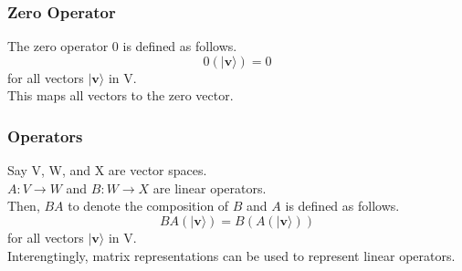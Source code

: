 \documentclass{article}
\begin{document}
\subsubsection{Zero Operator}
The zero operator \textbf{$0$} is defined as follows. \\
\begin{equation}
    0(|\mathbf{v}\rangle) = 0
\end{equation} for all vectors $|\mathbf{v}\rangle$ in V. \\
This maps all vectors to the zero vector. \\
\subsubsection{Operators}
Say V, W, and X are vector spaces. \\
$A: V \rightarrow W$ and $B: W \rightarrow X$ are linear operators. \\
Then, $BA$ to denote the composition of $B$ and $A$ is defined as follows. \\
\begin{equation}
    BA(|\mathbf{v}\rangle) = B(A(|\mathbf{v}\rangle))
\end{equation}
for all vectors $|\mathbf{v}\rangle$ in V. \\
Interengtingly, matrix representations can be used to represent linear operators. \\
\end{document}
